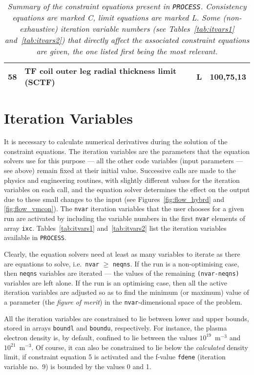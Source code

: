 \documentclass[11pt,a4paper]{report}
\newcommand{\process}{\mbox{\texttt{PROCESS}}}
\begin{document}
\begin{table}[tbph]
\begin{center}
\begin{tabular}{||c|l|c|l||}
58  & TF coil outer leg radial thickness limit (SCTF)     & L    & \textbf{100},75,13 \\
\hline
\end{tabular}
\end{center}
\caption[List of constraint equations]
{\label{tab:eqns}
  \textit{Summary of the constraint equations present in \process. Consistency
    equations are marked C, limit equations are marked L\@. Some
    (non-exhaustive) iteration variable numbers (see Tables~\ref{tab:itvars1}
    and~\ref{tab:itvars2}) that directly affect the associated constraint
    equations are given, the one listed first being the most relevant.}
}
\normalsize
\end{table}

\section{Iteration Variables}
\label{sec:itvars}

It is necessary to calculate numerical derivatives during the solution of the
constraint equations. The iteration variables are the parameters that the
equation solvers use for this purpose --- all the other code variables (input
parameters --- see above) remain fixed at their initial value. Successive
calls are made to the physics and engineering routines, with slightly
different values for the iteration variables on each call, and the equation
solver determines the effect on the output due to these small changes to the
input (see Figures~\ref{fig:flow_hybrd} and \ref{fig:flow_vmcon}). The
\texttt{nvar} iteration variables that the user chooses for a given run are
activated by including the variable numbers in the first \texttt{nvar}
elements of array \texttt{ixc}. Tables~\ref{tab:itvars1} and~\ref{tab:itvars2}
list the iteration variables available in \process.

Clearly, the equation solvers need at least as many variables to iterate as
there are equations to solve, i.e.\ \texttt{nvar} $\geq$ \texttt{neqns}. If
the run is a non-optimising case, then \texttt{neqns} variables are iterated
--- the values of the remaining \texttt{(nvar-neqns)} variables are left
alone. If the run is an optimising case, then all the active iteration
variables are adjusted so as to find the minimum (or maximum) value of a
parameter (the \textit{ figure of merit}) in the \texttt{nvar}-dimensional
space of the problem.

All the iteration variables are constrained to lie between lower and upper
bounds, stored in arrays \texttt{boundl} and \texttt{boundu},
respectively. For instance, the plasma electron density is, by default,
confined to lie between the values $10^{19}$~m$^{-3}$ and
$10^{21}$~m$^{-3}$. Of course, it can also be constrained to lie below the
\textit{calculated}\/ density limit, if constraint equation 5 is activated and
the f-value \texttt{fdene} (iteration variable no.\ 9) is bounded by the
values 0 and 1.
\end{document}
